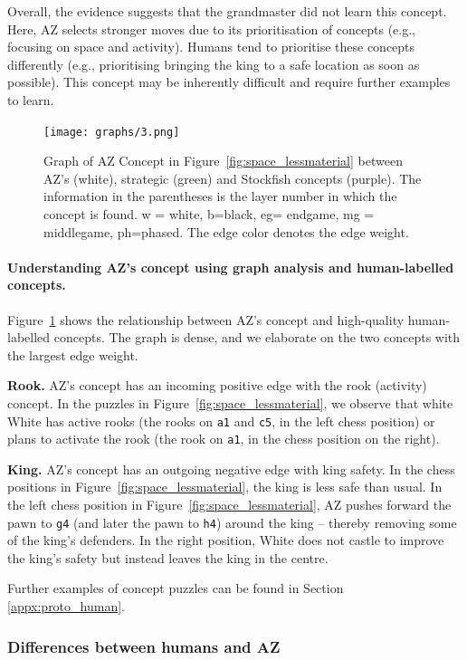 \documentclass{article}
\newcommand{\ct}[1]{\texttt{#1}}
\begin{document}
Overall, the evidence suggests that the grandmaster did not learn this concept. Here, 
AZ selects stronger moves due to its prioritisation of concepts (e.g., focusing on space and activity).
Humans tend to prioritise these concepts differently (e.g., prioritising bringing the king to a safe location as soon as possible). This concept may be inherently difficult and require further examples to learn. 

\begin{figure}[!ht]
\centering
\caption{Graph of AZ Concept in Figure~\ref{fig:space_lessmaterial}  between AZ's (white), strategic (green) and Stockfish concepts (purple).
The information in the parentheses is the layer number in which the concept is found. w = white, b=black, eg= endgame, mg = middlegame, ph=phased. The edge color denotes the edge weight.}
\texttt{[image: graphs/3.png]}
\label{fig:graph_3}
\end{figure}

\paragraph{Understanding AZ's concept using graph analysis and human-labelled concepts.} 
Figure~\ref{fig:graph_3} shows the relationship between AZ's concept and high-quality human-labelled concepts. The graph is dense, and we elaborate on the two concepts with the largest edge weight. 

\textbf{Rook.} AZ's concept has an incoming positive edge with the rook (activity) concept. In the puzzles in Figure~\ref{fig:space_lessmaterial}, we observe that white White has active rooks (the rooks on \ct{a1} and \ct{c5}, in the left chess position) or plans to activate the rook (the rook on \ct{a1}, in the chess position on the right).

\textbf{King.} AZ's concept has an outgoing negative edge with king safety. In the chess positions in Figure~\ref{fig:space_lessmaterial}, the king is less safe than usual. In the left chess position in Figure~\ref{fig:space_lessmaterial}, AZ pushes forward the pawn to \ct{g4} (and later the pawn to \ct{h4}) around the king -- thereby removing some of the king's defenders. In the right position, White does not castle to improve the king's safety but instead leaves the king in the centre. 

Further examples of concept puzzles can be found in Section \ref{appx:proto_human}.
\subsubsection{Differences between humans and AZ} \label{sec:diff_human_az}
\end{document}
